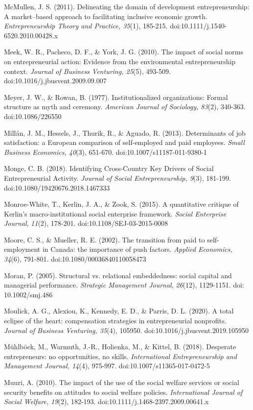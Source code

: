 \documentclass{article}
\begin{document}
McMullen, J. S. (2011). Delineating the domain of development entrepreneurship: A market--based approach to facilitating inclusive economic growth. \emph{Entrepreneurship Theory and Practice, 35}(1), 185-215. doi:10.1111/j.1540-6520.2010.00428.x

Meek, W. R., Pacheco, D. F., \& York, J. G. (2010). The impact of social norms on entrepreneurial action: Evidence from the environmental entrepreneurship context. \emph{Journal of Business Venturing, 25}(5), 493-509. doi:10.1016/j.jbusvent.2009.09.007

Meyer, J. W., \& Rowan, B. (1977). Institutionalized organizations: Formal structure as myth and ceremony. \emph{American Journal of Sociology, 83}(2), 340-363. doi:10.1086/226550

Millán, J. M., Hessels, J., Thurik, R., \& Aguado, R. (2013). Determinants of job satisfaction: a European comparison of self-employed and paid employees. \emph{Small Business Economics, 40}(3), 651-670. doi:10.1007/s11187-011-9380-1

Monge, C. B. (2018). Identifying Cross-Country Key Drivers of Social Entrepreneurial Activity. \emph{Journal of Social Entrepreneurship, 9}(3), 181-199. doi:10.1080/19420676.2018.1467333

Monroe-White, T., Kerlin, J. A., \& Zook, S. (2015). A quantitative critique of Kerlin's macro-institutional social enterprise framework. \emph{Social Enterprise Journal}, \emph{11}(2), 178-201. doi:10.1108/SEJ-03-2015-0008

Moore, C. S., \& Mueller, R. E. (2002). The transition from paid to self-employment in Canada: the importance of push factors. \emph{Applied Economics, 34}(6), 791-801. doi:10.1080/00036840110058473

Moran, P. (2005). Structural vs. relational embeddedness: social capital and managerial performance. \emph{Strategic Management Journal}, \emph{26}(12), 1129-1151. doi: 10.1002/smj.486

Moulick, A. G., Alexiou, K., Kennedy, E. D., \& Parris, D. L. (2020). A total eclipse of the heart: compensation strategies in entrepreneurial nonprofits. \emph{Journal of Business Venturing, 35}(4), 105950. doi:10.1016/j.jbusvent.2019.105950

Mühlböck, M., Warmuth, J.-R., Holienka, M., \& Kittel, B. (2018). Desperate entrepreneurs: no opportunities, no skills. \emph{International Entrepreneurship and Management Journal, 14}(4), 975-997. doi:10.1007/s11365-017-0472-5

Muuri, A. (2010). The impact of the use of the social welfare services or social security benefits on attitudes to social welfare policies. \emph{International Journal of Social Welfare, 19}(2), 182-193. doi:10.1111/j.1468-2397.2009.00641.x
\end{document}
